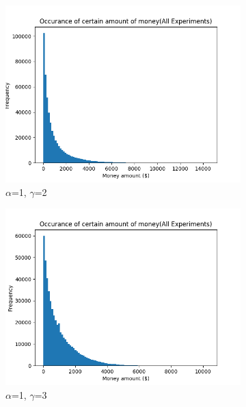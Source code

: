 \documentclass[12pt]{article} %
\begin{document}
\begin{figure}[h!]
\begin{subfigure}{\scaleTextWidth\textwidth}
		\includegraphics[scale=\scaleResultsA]{a1g2.png}
		\caption{$\alpha$=1, $\gamma$=2}
		\label{fig:a1g2}
	\end{subfigure}
	\begin{subfigure}{\scaleTextWidth\textwidth}
		\includegraphics[scale=\scaleResultsA]{a1g3.png}
		\caption{$\alpha$=1, $\gamma$=3}
		\label{fig:a1g3}
	\end{subfigure}\\[1ex]
	\begin{subfigure}{\scaleTextWidth\textwidth}

\end{subfigure}
\end{figure}
\end{document}

